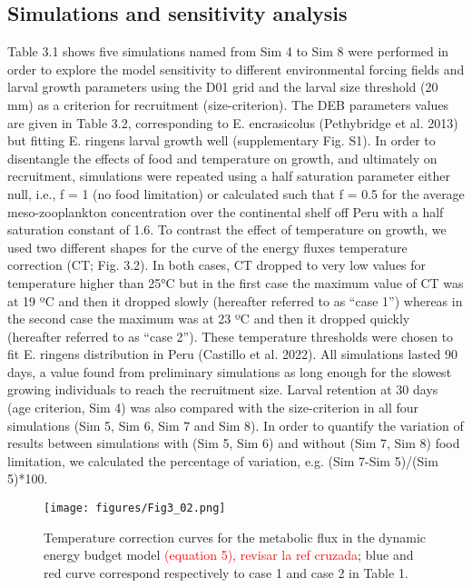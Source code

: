 \subsection{Simulations and sensitivity analysis}
Table 3.1 shows five simulations named from Sim 4 to Sim 8 were performed in order
to explore the model sensitivity to different environmental forcing fields and larval growth
parameters using the D01 grid and the larval size threshold (20 mm) as a criterion for
recruitment (size-criterion). The DEB parameters values are given in Table 3.2, corresponding
to E. encrasicolus (Pethybridge et al. 2013) but fitting E. ringens larval growth
well (supplementary Fig. S1). In order to disentangle the effects of food and temperature
on growth, and ultimately on recruitment, simulations were repeated using a half
saturation parameter either null, i.e., f = 1 (no food limitation) or calculated such that f =
0.5 for the average meso-zooplankton concentration over the continental shelf off Peru with a half saturation constant of 1.6. To contrast the effect of temperature on growth, we
used two different shapes for the curve of the energy fluxes temperature correction (CT;
Fig. 3.2). In both cases, CT dropped to very low values for temperature higher than 25°C
but in the first case the maximum value of CT was at 19 ºC and then it dropped slowly
(hereafter referred to as “case 1”) whereas in the second case the maximum was at 23
ºC and then it dropped quickly (hereafter referred to as “case 2”). These temperature
thresholds were chosen to fit E. ringens distribution in Peru (Castillo et al. 2022). All simulations lasted 90 days, a value found from preliminary simulations as long enough for
the slowest growing individuals to reach the recruitment size. Larval retention at 30 days (age criterion, Sim 4) was also compared with the size-criterion in all four simulations
(Sim 5, Sim 6, Sim 7 and Sim 8). In order to quantify the variation of results between
simulations with (Sim 5, Sim 6) and without (Sim 7, Sim 8) food limitation, we calculated the percentage of variation, e.g. (Sim 7-Sim 5)/(Sim 5)*100.

\begin{figure}[ht]
	\texttt{[image: figures/Fig3\_02.png]}
	\centering
	\caption{Temperature correction curves for the metabolic flux in the dynamic energy budget model \textcolor{red}{(equation 5), revisar la ref cruzada}; blue and red curve correspond respectively to case 1 and case 2 in Table 1.}
	\label{Fig3_02}
\end{figure}

